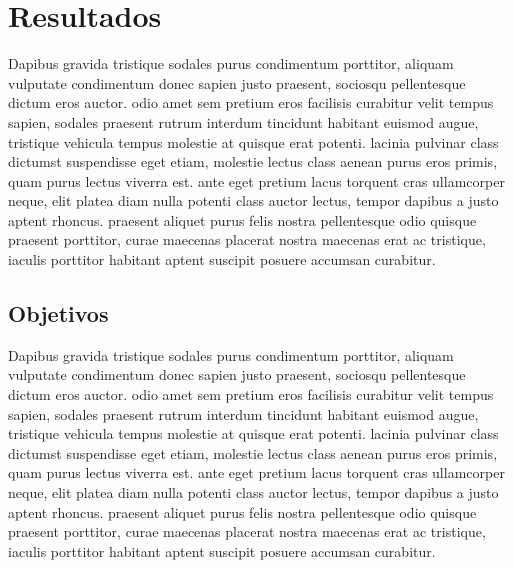 \chapter{Resultados}      \label{Resultados}

Dapibus gravida tristique sodales purus condimentum porttitor, aliquam vulputate condimentum donec sapien justo praesent, sociosqu pellentesque dictum eros auctor. odio amet sem pretium eros facilisis curabitur velit tempus sapien, sodales praesent rutrum interdum tincidunt habitant euismod augue, tristique vehicula tempus molestie at quisque erat potenti. lacinia pulvinar class dictumst suspendisse eget etiam, molestie lectus class aenean purus eros primis, quam purus lectus viverra est. ante eget pretium lacus torquent cras ullamcorper neque, elit platea diam nulla potenti class auctor lectus, tempor dapibus a justo aptent rhoncus. praesent aliquet purus felis nostra pellentesque odio quisque praesent porttitor, curae maecenas placerat nostra maecenas erat ac tristique, iaculis porttitor habitant aptent suscipit posuere accumsan curabitur.


\section{Objetivos}

Dapibus gravida tristique sodales purus condimentum porttitor, aliquam vulputate condimentum donec sapien justo praesent, sociosqu pellentesque dictum eros auctor. odio amet sem pretium eros facilisis curabitur velit tempus sapien, sodales praesent rutrum interdum tincidunt habitant euismod augue, tristique vehicula tempus molestie at quisque erat potenti. lacinia pulvinar class dictumst suspendisse eget etiam, molestie lectus class aenean purus eros primis, quam purus lectus viverra est. ante eget pretium lacus torquent cras ullamcorper neque, elit platea diam nulla potenti class auctor lectus, tempor dapibus a justo aptent rhoncus. praesent aliquet purus felis nostra pellentesque odio quisque praesent porttitor, curae maecenas placerat nostra maecenas erat ac tristique, iaculis porttitor habitant aptent suscipit posuere accumsan curabitur.